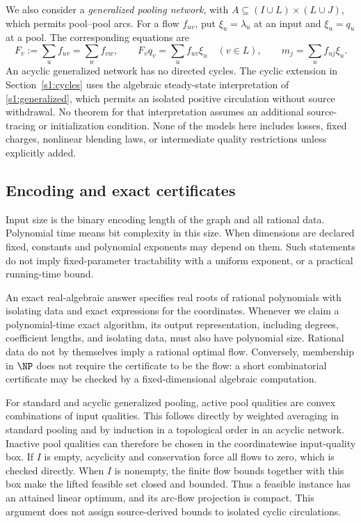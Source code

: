 We also consider a \emph{generalized pooling network}, with
$A\subseteq(I\cup L)\times(L\cup J)$, which permits pool--pool arcs.
For a flow $f_{uv}$, put $\xi_u=\lambda_u$ at an input and $\xi_u=q_u$
at a pool. The corresponding equations are
\begin{equation}
 F_v:=\sum_u f_{uv}=\sum_w f_{vw},\qquad
 F_vq_v=\sum_u f_{uv}\xi_u \quad(v\in L),\qquad
 m_j=\sum_u f_{uj}\xi_u.\label{s1:generalized}
\end{equation}
An acyclic generalized network has no directed cycles. The cyclic
extension in Section~\ref{s1:cycles} uses the algebraic steady-state
interpretation of \eqref{s1:generalized}, which permits an isolated
positive circulation without source withdrawal. No theorem for that
interpretation assumes an additional source-tracing or initialization
condition. None of the models here includes losses, fixed charges,
nonlinear blending laws, or intermediate quality restrictions unless
explicitly added.

\subsection{Encoding and exact certificates}\label{s1:encoding}

Input size is the binary encoding length of the graph and all rational
data. Polynomial time means bit complexity in this size. When dimensions
are declared fixed, constants and polynomial exponents may depend on
them. Such statements do not imply fixed-parameter tractability with a
uniform exponent, or a practical running-time bound.

An exact real-algebraic answer specifies real roots of rational
polynomials with isolating data and exact expressions for the coordinates.
Whenever we claim a polynomial-time exact algorithm, its output
representation, including degrees, coefficient lengths, and isolating
data, must also have polynomial size. Rational data do not by themselves
imply a rational optimal flow. Conversely, membership in $\NP$ does not
require the certificate to be the flow: a short combinatorial certificate
may be checked by a fixed-dimensional algebraic computation.

For standard and acyclic generalized pooling, active pool qualities are
convex combinations of input qualities. This follows directly by
weighted averaging in standard pooling and by induction in a topological
order in an acyclic network. Inactive pool qualities can therefore be
chosen in the coordinatewise input-quality box. If $I$ is empty, acyclicity
and conservation force all flows to zero, which is checked directly.
When $I$ is nonempty, the finite flow bounds together with this box make
the lifted feasible set closed and bounded. Thus a feasible instance
has an attained linear optimum, and its arc-flow projection is compact.
This argument does not assign source-derived bounds to isolated cyclic
circulations.

